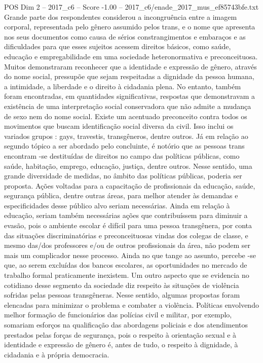 \begin{textsample}{POS Dim 2 – 2017\_c6 – Score -1.00 – 2017\_c6/enade\_2017\_mus\_ef85743bfe.txt}
Grande parte dos respondentes considerou a incongruência entre a imagem corporal, representada pelo gênero assumido pelos trans, e o nome que apresenta nos seus documentos como causa de sérios constrangimentos e embaraços e as dificuldades para que esses sujeitos acessem direitos básicos, como saúde, educação e empregabilidade em uma sociedade heteronormativa e preconceituosa.
Muitos demonstraram reconhecer que a identidade e expressão de gênero, através do nome social, pressupõe que sejam respeitadas a dignidade da pessoa humana, a intimidade, a liberdade e o direito à cidadania plena.
No entanto, também foram encontradas, em quantidades significativas, respostas que demonstravam a existência de uma interpretação social conservadora que não admite a mudança de sexo nem do nome social.
Existe um acentuado preconceito contra todos os movimentos que buscam identificação social diversa da civil.
Isso inclui os variados grupos : gays, travestis, transgêneros, dentre outros.
Já em relação ao segundo tópico a ser abordado pelo concluinte, é notório que as pessoas trans encontram -se destituídas de direitos no campo das políticas públicas, como saúde, habitação, emprego, educação, justiça, dentre outros.
Nesse sentido, uma grande diversidade de medidas, no âmbito das políticas públicas, poderia ser proposta.
Ações voltadas para a capacitação de profissionais da educação, saúde, segurança pública, dentre outras áreas, para melhor atender às demandas e especificidades desse público alvo seriam necessárias.
Ainda em relação à educação, seriam também necessárias ações que contribuíssem para diminuir a evasão, pois o ambiente escolar é difícil para uma pessoa transgênera, por conta das situações discriminatórias e preconceituosas vindas dos colegas de classe, e mesmo das/dos professores e/ou de outros profissionais da área, não podem ser mais um complicador nesse processo.
Ainda no que tange ao assunto, percebe -se que, ao serem excluídas dos bancos escolares, as oportunidades no mercado de trabalho formal praticamente inexistem.
Um outro aspecto que se evidencia no cotidiano desse segmento da sociedade diz respeito às situações de violência sofridas pelas pessoas transgêneras.
Nesse sentido, algumas propostas foram elencadas para minimizar o problema e combater a violência.
Políticas envolvendo melhor formação de funcionários das polícias civil e militar, por exemplo, somariam esforços na qualificação das abordagens policiais e dos atendimentos prestados pelas forças de segurança, pois o respeito à orientação sexual e à identidade e expressão de gênero é, antes de tudo, o respeito à dignidade, à cidadania e à própria democracia.

\end{textsample}

